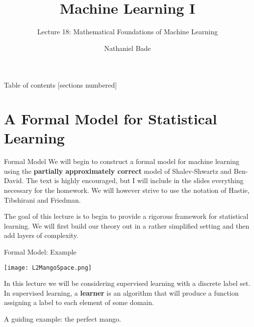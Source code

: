 \documentclass[10pt, table, handout]{beamer}
\title{Machine Learning I}
\subtitle{Lecture 18: Mathematical Foundations of Machine Learning}
\date{}
\author{Nathaniel Bade}
\institute{Northeastern University Department of Mathematics}
\begin{document}
\maketitle

\begin{frame}{Table of contents}
  [sections numbered]
  \tableofcontents[hideallsubsections]
\end{frame}



\section{A Formal Model for Statistical Learning}


\begin{frame}[fragile]{Formal Model}
We will begin to construct a formal model for machine learning using the \textbf{partially approximately correct} model of Shalev-Shwartz and Ben-David. The text is highly encouraged, but I will include in the slides everything necessary for the homework. We will however strive to use the notation of Hastie, Tibshirani and Friedman.  

The goal of this lecture is to begin to provide a rigorous framework for statistical learning. We will first build our theory out in a rather simplified setting and then add layers of complexity. 

\end{frame}




\begin{frame}[fragile]{Formal Model: Example}
  \begin{minipage}[t][0.5\textheight][t]{\textwidth}
    \texttt{[image: L2MangoSpace.png]}
        \centering
  \end{minipage}
  \vfill
  \begin{minipage}[t][0.5\textheight][t]{\textwidth}
In this lecture we will be considering supervised learning with a discrete label set. In supervised learning, a \textbf{learner} is an algorithm that will produce a function assigning a label to each element of some domain.\newline\pause

A guiding example: the perfect mango. 
  \end{minipage}

\end{frame}
\end{document}
